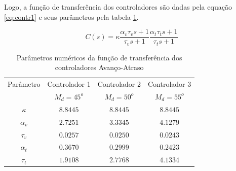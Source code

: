 \documentclass{article}
\begin{document}
Logo, a função de transferência dos controladores são dadas pela equação \ref{eq:contr1} e seus parâmetros pela tabela \ref{tab:contr}.

\begin{equation}
\label{eq:contr}
C(s)=\kappa \frac{\alpha_v \tau_v s + 1}{\tau_v s + 1} \frac{\alpha_t \tau_t s + 1}{\tau_t s + 1}
\end{equation}

\begin{table}[H]
	\centering
	\caption{Parâmetros numéricos da função de transferência dos controladores Avanço-Atraso}
	\label{tab:contr}
	\begin{tabular}{|c|c|c|c|}
		\hline Parâmetro & Controlador 1& Controlador 2& Controlador 3 \\ 
		&$M_d = 45^o$&$M_d = 50^o$&$M_d = 55^o$\\
		\hline $\kappa$ & $8.8445$ & $8.8445$ & $8.8445$\\ 
		\hline $\alpha_v$ & $2.7251$ & $3.3345$ & $4.1279$\\ 
		\hline $\tau_v$ & $0.0257$ & $0.0250$ & $0.0243$\\ 
		\hline $\alpha_t$ & $0.3670$ & $0.2999$ & $0.2423$\\ 
		\hline $\tau_t$ & $1.9108$ & $2.7768$ & $4.1334$\\ 
		\hline 
	\end{tabular} 
\end{table}
\end{document}
